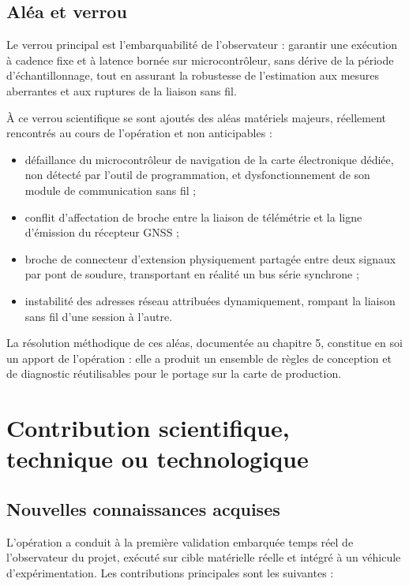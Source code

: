 \subsection{Aléa et verrou}

Le verrou principal est l’embarquabilité de l’observateur : garantir une exécution à cadence fixe et à latence bornée sur microcontrôleur, sans dérive de la période d’échantillonnage, tout en assurant la robustesse de l’estimation aux mesures aberrantes et aux ruptures de la liaison sans fil.

À ce verrou scientifique se sont ajoutés des aléas matériels majeurs, réellement rencontrés au cours de l’opération et non anticipables :

\begin{itemize}
\item défaillance du microcontrôleur de navigation de la carte électronique dédiée, non détecté par l’outil de programmation, et dysfonctionnement de son module de communication sans fil ;
\item conflit d’affectation de broche entre la liaison de télémétrie et la ligne d’émission du récepteur GNSS ;
\item broche de connecteur d’extension physiquement partagée entre deux signaux par pont de soudure, transportant en réalité un bus série synchrone ;
\item instabilité des adresses réseau attribuées dynamiquement, rompant la liaison sans fil d’une session à l’autre.
\end{itemize}

La résolution méthodique de ces aléas, documentée au chapitre 5, constitue en soi un apport de l’opération : elle a produit un ensemble de règles de conception et de diagnostic réutilisables pour le portage sur la carte de production.

\section{Contribution scientifique, technique ou technologique}

\subsection{Nouvelles connaissances acquises}

L’opération a conduit à la première validation embarquée temps réel de l’observateur du projet, exécuté sur cible matérielle réelle et intégré à un véhicule d’expérimentation. Les contributions principales sont les suivantes :


